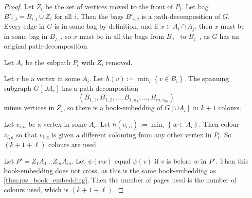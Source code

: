 \begin{proof}
	Let $Z_i$ be the set of vertices moved to the front of $P_i$. Let bag $B'_{i,j} = B_{i,j} \cup Z_i$ for all $i$. Then the bags $B'_{i,j}$ is a path-decomposition of $G$. Every edge in $G$ is in some bag by definition, and if $x \in A_i \cap A_j$, then $x$ must be in some bag in $B_{j, \cdot}$, so $x$ must be in all the bags from $B_{a, \cdot}$ to $B_{j, \cdot}$, as $G$ has an original path-decomposition.  
	
	Let $A_i$ be the subpath $P_i$ with $Z_i$ removed. 

	Let $v$ be a vertex in some $A_i$. Let $h(v):= \min_i\left\{ v \in B_i \right\}$. The spanning subgraph $G[\cup A_i]$ has a path-decomposition \[(B_{1,1}, B_{1,2}, \ldots, B_{1,n_{1}}, \ldots, B_{m, n_{m}})\] minus vertices in $Z_i$, so there is a book-embedding of $G[\cup A_i]$ in $k + 1$ colours.
	
	Let $v_{i,a}$ be a vertex in some $A_i$. Let $h(v_{i,a}) := \min_i\left\{ w \in A_i \right\}$. Then colour $v_{i,a}$ so that $v_{i,a}$ is given a different colouring from any other vertex in $P_i$. So $(k + 1 + \ell)$ colours are used.


	Let $P' = Z_1 A_1 \ldots Z_m A_m$. Let $\psi(vw)$ equal $\psi(v)$ if $v$ is before $w$ in $P'$. Then this book-embedding does not cross, as this is the same book-embedding as \cref{thm:pw_book_embedding}. Then the number of pages used is the number of colours used, which is $(k + 1 + \ell)$. 

\end{proof}